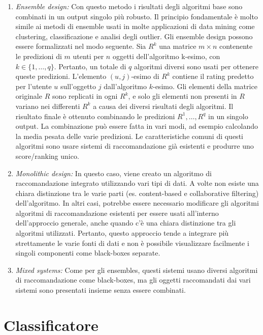 \documentclass[12pt,italian]{report}
\begin{document}
\begin{enumerate}
 \item \textit{Ensemble design:} Con questo metodo i risultati degli algoritmi base sono combinati in un output singolo più robusto. Il principio fondamentale è molto simile ai metodi di ensemble usati in molte applicazioni di data mining come clustering, classificazione e analisi degli outlier. 
Gli ensemble design possono essere formalizzati nel modo seguente. Sia $R^k$ una matrice $m \times n$ contenente le predizioni di $m$ utenti per $n$ oggetti dell'algoritmo k-esimo, con $k \in \{1, \dots ,q\}$. Pertanto, un totale di $q$ algoritmi diversi sono usati per ottenere queste predizioni. L'elemento $(u,j)$-esimo di $R^k$ contiene il rating predetto per l'utente $u$ sull'oggetto $j$ dall'algoritmo $k$-esimo. Gli elementi della matrice originale $R$ sono replicati in ogni $R^k$, e solo gli elementi non presenti in $R$ variano nei differenti $R^k$ a causa dei diversi risultati degli algoritmi. Il risultato finale è ottenuto combinando le predizioni $R^1, \dots, R^q$ in un singolo output. La combinazione può essere fatta in vari modi, ad esempio calcolando la media pesata delle varie predizioni. Le caratteristiche comuni di questi algoritmi sono usare sistemi di raccomandazione già esistenti e produrre uno score/ranking unico.
 \item \textit{Monolithic design:} In questo caso, viene creato un algoritmo di raccomandazione integrato utilizzando vari tipi di dati. A volte non esiste una chiara distinzione tra le varie parti (es. content-based e collaborative filtering) dell'algoritmo. In altri casi, potrebbe essere necessario modificare gli algoritmi algoritmi di raccomandazione esistenti per essere usati all'interno dell'approccio generale, anche quando c'è una chiara distinzione tra gli algoritmi utilizzati.  Pertanto, questo approccio tende a integrare più strettamente le varie fonti di dati e non è possibile visualizzare facilmente i singoli componenti come black-boxes separate.
 \item \textit{Mixed systems:}  Come per gli ensembles, questi sistemi usano diversi algoritmi di raccomandazione come black-boxes, ma gli oggetti raccomandati dai vari sistemi sono presentati insieme senza essere combinati.
\end{enumerate} 


% 
% 

\chapter{Classificatore}
\label{chap:classificatore}
\end{document}
